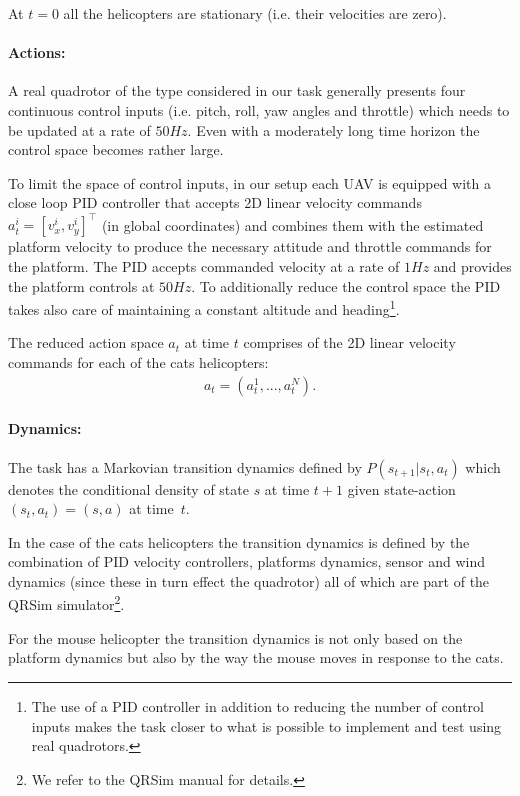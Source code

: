 \documentclass[a4paper,11pt]{report}
\newcommand{\sname}{QRSim\xspace}
\begin{document}
At $t=0$ all the helicopters are stationary (i.e. their velocities are zero).

\paragraph{Actions:}\label{catmouseactions} 
A real quadrotor of the type considered in our task generally presents four continuous control inputs (i.e. pitch, roll, yaw angles and throttle) which needs to be updated at a rate of $50Hz$. Even with a moderately long time horizon the control space becomes rather large.

To limit the space of control inputs, in our setup each UAV is equipped with a close loop PID controller that accepts 2D linear velocity commands $a^i_t=[v^i_x,v^i_y]^\intercal$ (in global coordinates) and combines them with the estimated platform velocity to produce the necessary attitude and throttle commands for the platform. The PID accepts commanded velocity at a rate of $1Hz$ and provides the platform controls at $50Hz$.
To additionally reduce the control space the PID takes also care of maintaining a constant altitude and heading\footnote{The use of a PID controller in addition to reducing the number of control inputs makes the task closer to what is possible to implement and test using real quadrotors.}. 

The reduced action space $a_t$ at time $t$ comprises of the 2D linear velocity commands for each of the cats helicopters:
\begin{align}
a_t = (a^1_t,...,a^{N}_t).
\end{align}

\paragraph{Dynamics:} 
The task has a Markovian transition dynamics defined by $P(s_{t+1}|s_t,a_t)$ which denotes the conditional density of state $s$ at time $t+1$ given state-action $(s_t,a_t)=(s,a)$ at time~$t$.

In the case of the cats helicopters the transition dynamics is defined by the combination of PID velocity controllers, platforms dynamics, sensor and wind dynamics (since these in turn effect the quadrotor) all of which are part of the \sname simulator\footnote{We refer to the \sname manual for details.}. 

For the mouse helicopter the transition dynamics is 
not only based on the platform dynamics but also by the way the mouse moves in response to the cats.
\end{document}
